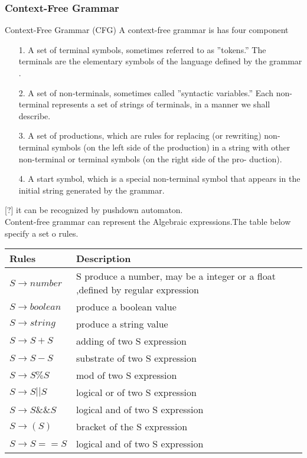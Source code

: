 \subsubsection{Context-Free Grammar}
Context-Free Grammar (CFG)
A context-free grammar is has four component
\begin{itemize}
\item [1.] A set of terminal symbols, sometimes referred to as ”tokens.” The
terminals are the elementary symbols of the language defined by the
grammar .
\item [2.] A set of non-terminals, sometimes called ”syntactic variables.” Each
non- terminal represents a set of strings of terminals, in a manner we
shall describe.
\item [3.] A set of productions, which are rules for replacing (or rewriting) non-
terminal symbols (on the left side of the production) in a string with
other non-terminal or terminal symbols (on the right side of the pro-
duction).
\item [4.] A start symbol, which is a special non-terminal symbol that appears in the initial string generated by the grammar.
\end{itemize}
[?] it can be recognized by pushdown automaton.\\

Content-free grammar can represent the Algebraic expressions.The table below specify a set o rules. 

\begin{tabular}{|p{6cm}|p{6cm}|}
\hline \textbf{Rules} & \textbf{Description}\\ 
\hline  $S \rightarrow number $ & S produce a number, may be a integer or a float ,defined by regular expression  \\ 
\hline  $ S \rightarrow boolean $ &  produce a boolean value \\ 
\hline  $ S \rightarrow string $&  produce a string value \\ 
\hline  $ S \rightarrow S+S $&  adding of two S expression\\ 
\hline  $ S \rightarrow S-S $ &  substrate of two S expression\\
\hline $  S\rightarrow S \%S $ & mod of two S expression \\
\hline $  S\rightarrow S || S $ &  logical or of two S expression\\
\hline $ S \rightarrow S \&\& S $ & logical and of two S expression \\
\hline $ S \rightarrow ( S) $ &  bracket of the S expression\\
\hline $ S \rightarrow S == S $ & logical and of two S expression \\
\hline 
\end{tabular} 

